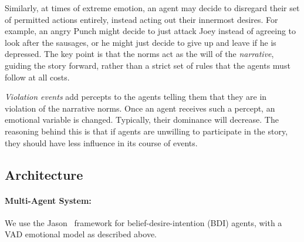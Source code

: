 \documentclass[11pt]{report}
\begin{document}
Similarly, at times of extreme emotion, an agent may decide to disregard their set of permitted actions entirely, instead acting out their innermost desires. For example, an angry Punch might decide to just attack Joey instead of agreeing to look after the sausages, or he might just decide to give up and leave if he is depressed. The key point is that the norms act as the will of the \emph{narrative}, guiding the story forward, rather than a strict set of rules that the agents must follow at all costs.

\emph{Violation events\/} add percepts to the agents telling them that they are in violation of the narrative norms. Once an agent receives such a percept, an emotional variable is changed. Typically, their dominance will decrease. The reasoning behind this is that if agents are unwilling to participate in the story, they should have less influence in its course of events.

\subsection{Architecture}\label{sec:arch}

\paragraph{Multi-Agent System:} \label{sec:arch-mas}
We use the Jason~\citep{bordini2007programming} framework for belief-desire-intention (BDI) agents, with a VAD
emotional model as described above.
\end{document}

